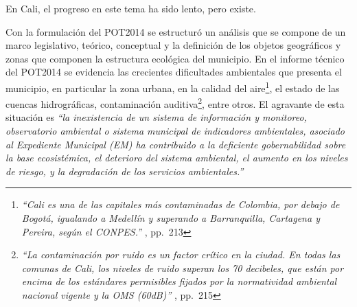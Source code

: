 \documentclass[12pt,]{book}
\let\rmarkdownfootnote\footnote%
\def\footnote{\protect\rmarkdownfootnote}
\begin{document}
En Cali, el progreso en este tema ha sido lento, pero existe.

Con la formulación del POT2014 se estructuró un análisis que se compone
de un marco legislativo, teórico, conceptual y la definición de los
objetos geográficos y zonas que componen la estructura ecológica del
municipio. En el informe técnico del POT2014 se evidencia las crecientes
dificultades ambientales que presenta el municipio, en particular la
zona urbana, en la calidad del aire\footnote{\emph{``Cali es una de las
  capitales más contaminadas de Colombia, por debajo de Bogotá,
  igualando a Medellín y superando a Barranquilla, Cartagena y Pereira,
  según el CONPES.''} \citet{noauthor_plan_nodate}, pp.~213}, el estado
de las cuencas hidrográficas, contaminación auditiva\footnote{\emph{``La
  contaminación por ruido es un factor crítico en la ciudad. En todas
  las comunas de Cali, los niveles de ruido superan los 70 decibeles,
  que están por encima de los estándares permisibles fijados por la
  normatividad ambiental nacional vigente y la OMS (60dB)''}
  \citet{noauthor_plan_nodate}, pp.~215}, entre otros. El agravante de
esta situación es \emph{``la inexistencia de un sistema de información y
monitoreo, observatorio ambiental o sistema municipal de indicadores
ambientales, asociado al Expediente Municipal (EM) ha contribuido a la
deficiente gobernabilidad sobre la base ecosistémica, el deterioro del
sistema ambiental, el aumento en los niveles de riesgo, y la degradación
de los servicios ambientales.''} \citep[pp.~233]{noauthor_plan_nodate}
\end{document}
